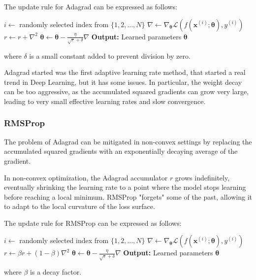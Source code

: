 The update rule for Adagrad can be expressed as follows:
\begin{algorithm}[H]
    \caption{Adagrad}
    \begin{algorithmic}[1]
            \State $i \leftarrow$ randomly selected index from $\{1, 2, \ldots, N\}$
            \State $\nabla \leftarrow \nabla_{\boldsymbol{\theta}} \mathcal{L}(f(\boldsymbol{x}^{(i)}; \boldsymbol{\theta}), y^{(i)})$
            \State $r \leftarrow r + \nabla^2$
            \State $\boldsymbol{\theta} \leftarrow \boldsymbol{\theta} - \frac{\eta}{\sqrt{r} + \delta} \nabla$
        \EndWhile
        \State \textbf{Output:} Learned parameters $\boldsymbol{\theta}$
    \end{algorithmic}
\end{algorithm}
where $\delta$ is a small constant added to prevent division by zero.

Adagrad started was the first adaptive learning rate method, that started a real trend in Deep Learning, but it has some issues.
In particular, the weight decay can be too aggressive, as the accumulated squared gradients can grow very large, leading to very small effective 
learning rates and slow convergence.

\subsubsection*{RMSProp}
The problem of Adagrad can be mitigated in non-convex settings by replacing the accumulated squared gradients with 
an exponentially decaying average of the gradient.

In non-convex optimization, the Adagrad accumulator $r$ grows indefinitely, 
eventually shrinking the learning rate to a point where the model stops learning before reaching a local minimum. 
RMSProp "forgets" some of the past, allowing it to adapt to the local curvature of the loss surface.

The update rule for RMSProp can be expressed as follows:
\begin{algorithm}[H]
    \caption{RMSProp}
    \begin{algorithmic}[1]
            \State $i \leftarrow$ randomly selected index from $\{1, 2, \ldots, N\}$
            \State $\nabla \leftarrow \nabla_{\boldsymbol{\theta}} \mathcal{L}(f(\boldsymbol{x}^{(i)}; \boldsymbol{\theta}), y^{(i)})$
            \State $r \leftarrow \beta r + (1 - \beta) \nabla^2$
            \State $\boldsymbol{\theta} \leftarrow \boldsymbol{\theta} - \frac{\eta}{\sqrt{r} + \delta} \nabla$
        \EndWhile
        \State \textbf{Output:} Learned parameters $\boldsymbol{\theta}$
    \end{algorithmic}
\end{algorithm}
where $\beta$ is a decay factor.

